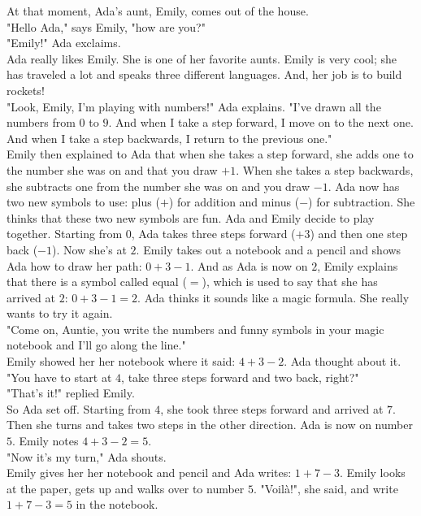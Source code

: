 At that moment, Ada's aunt, Emily, comes out of the house.\\
"Hello Ada," says Emily, "how are you?"\\
"Emily!" Ada exclaims.\\
Ada really likes Emily. She is one of her favorite aunts.
Emily is very cool; she has traveled a lot and speaks three different languages. And, her job is to build rockets!\\
"Look, Emily, I'm playing with numbers!" Ada explains. "I've drawn all the numbers from $0$ to $9$. And when I take a step forward, I move on to the next one. And when I take a step backwards, I return to the previous one." \\
Emily then explained to Ada that when she takes a step forward, she adds one to the number she was on and that you draw $+1$. When she takes a step backwards, she subtracts one from the number she was on and you draw $-1$. Ada now has two new symbols to use: plus ($+$) for addition and minus ($-$) for subtraction. She thinks that these two new symbols are fun. Ada and Emily decide to play together. Starting from $0$, Ada takes three steps forward ($+3$) and then one step back ($-1$). Now she's at $2$. Emily takes out a notebook and a pencil and shows Ada how to draw her path: $0 + 3 - 1$. And as Ada is now on $2$, Emily explains that there is a symbol called equal ($=$), which is used to say that she has arrived at $2$: $0 + 3 - 1 = 2$. Ada thinks it sounds like a magic formula. She really wants to try it again. \\
"Come on, Auntie, you write the numbers and funny symbols in your magic notebook and I'll go along the line."\\
Emily showed her her notebook where it said: $4 + 3 - 2$. Ada thought about it. \\
"You have to start at $4$, take three steps forward and two back, right?" \\
"That's it!" replied Emily. \\
So Ada set off. Starting from $4$, she took three steps forward and arrived at $7$.
Then she turns and takes two steps in the other direction. Ada is now on number $5$. Emily notes $4 + 3 - 2 = 5$.\\
"Now it's my turn," Ada shouts.\\
Emily gives her her notebook and pencil and Ada writes: $1 + 7 - 3$. Emily looks at the paper, gets up and walks over to number $5$.
"Voilà!", she said, and write $1 + 7 - 3 = 5$ in the notebook.\\
